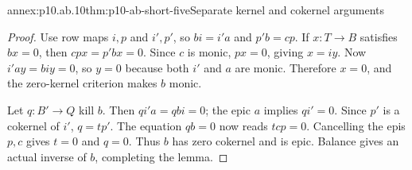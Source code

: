 \begin{annexitem}{annex:p10.ab.10}{thm:p10-ab-short-five}{Separate kernel and cokernel arguments}
\begin{proof}
Use row maps \(i,p\) and \(i',p'\), so \(bi=i'a\) and
\(p'b=cp\). If \(x:T\to B\) satisfies \(bx=0\), then
\(cpx=p'bx=0\). Since \(c\) is monic, \(px=0\), giving
\(x=iy\). Now \(i'ay=biy=0\), so \(y=0\) because both
\(i'\) and \(a\) are monic. Therefore \(x=0\), and the zero-kernel
criterion makes \(b\) monic.

Let \(q:B'\to Q\) kill \(b\). Then \(qi'a=qbi=0\);
the epic \(a\) implies \(qi'=0\). Since \(p'\) is a cokernel
of \(i'\), \(q=tp'\). The equation \(qb=0\) now reads
\(tcp=0\). Cancelling the epis \(p,c\) gives \(t=0\) and
\(q=0\). Thus \(b\) has zero cokernel and is epic. Balance gives
an actual inverse of \(b\), completing the lemma.
\end{proof}
\end{annexitem}

